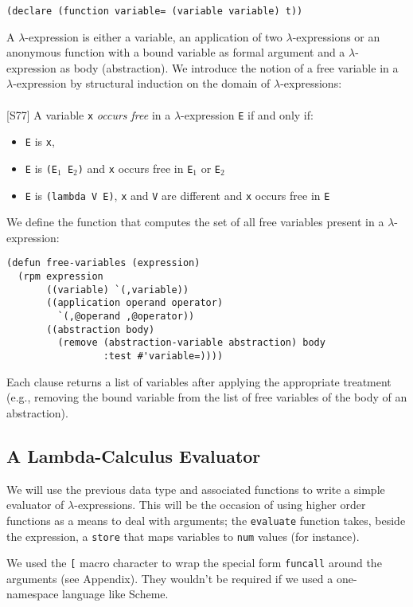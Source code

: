 \begin{sloppypar}
\begin{verbatim}
(declare (function variable= (variable variable) t))
\end{verbatim}
A $\lambda$-expression is either a variable, an application of two
$\lambda$-expressions or an anonymous function with a
bound variable as formal argument and a $\lambda$-expression as body
(abstraction). 
We introduce the notion of a free variable in a $\lambda$-expression
by structural induction on the domain of $\lambda$-expressions:
{~~~~~}\\
~~~~~\\
 [S77] A variable {\tt x} {\em occurs free} in a
$\lambda$-expression {\tt E} if and only if:
\begin{itemize}
\item {\tt E} is {\tt x},
\item {\tt E} is {\tt (E${}_1$ E${}_2$)} and {\tt x} occurs free in
{\tt E${}_1$} or {\tt E${}_2$}
\item {\tt E} is {\tt (lambda V E)}, {\tt x} and {\tt V} are
different and {\tt x} occurs free in {\tt E}
\end{itemize}

\noindent We define the function that computes the set of all free
variables present in a $\lambda$-expression:
\begin{verbatim}
(defun free-variables (expression)
  (rpm expression
       ((variable) `(,variable))
       ((application operand operator)
         `(,@operand ,@operator))
       ((abstraction body)
         (remove (abstraction-variable abstraction) body
                 :test #'variable=))))
\end{verbatim}
Each clause returns a list of variables after applying the
appropriate treatment (e.g., removing the bound variable from the list
of free variables of the body of an abstraction). 

\subsection{A Lambda-Calculus Evaluator}

We will use the previous data type and associated functions to write a
simple evaluator of $\lambda$-expressions. This will be the occasion
of using higher order functions as a means to deal with
arguments; the {\tt evaluate} function takes, beside the expression, 
a {\tt store} that maps variables to {\tt num} values (for instance).

We used the {\tt [} macro character to wrap the special form {\tt funcall}
around the arguments (see Appendix). They wouldn't be required if we
used a one-namespace language like Scheme.


\end{sloppypar}
